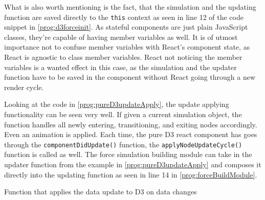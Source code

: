 What is also worth mentioning is the fact, that the simulation and the updating function are saved directly to the \texttt{this} context as seen in line 12 of the code snippet in \ref{prog:d3forceinit}. As stateful components are just plain JavaScript classes, they're capable of having member variables as well. It is of utmost importance not to confuse member variables with React's component state, as React is agnostic to class member variables. React not noticing the member variables is a wanted effect in this case, as the simulation and the updater function have to be saved in the component without React going through a new render cycle. 

Looking at the code in \ref{prog:pureD3updateApply}, the update applying functionality can be seen very well. If given a current simulation object, the function handles all newly entering, transitioning, and exiting nodes accordingly. Even an animation is applied. Each time, the pure D3 react component has goes through the \texttt{componentDidUpdate()} function, the \texttt{applyNodeUpdateCycle()} function is called as well. The force simulation building module can take in the updater function from the example in \ref{prog:pureD3updateApply} and composes it directly into the updating function as seen in line 14 in \ref{prog:forceBuildModule}.

\begin{program}[H]
\caption{Function that applies the data update to D3 on data changes}
\label{prog:pureD3updateApply}
\end{program}

